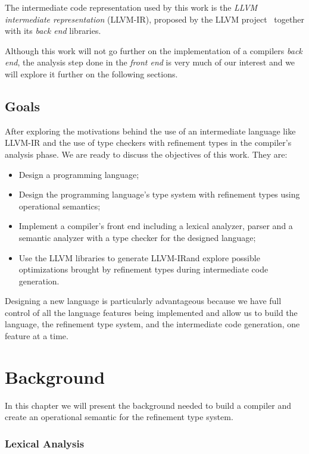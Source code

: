 \documentclass[english, lmodern, oneside, embeddedlogo]{ufsc-thesis-rn46-2019}
\begin{document}
The intermediate code representation used by this work is the \textit{LLVM intermediate representation} (LLVM-IR), proposed by the LLVM project~\cite{lattner2004llvm} together with its \textit{back end} libraries.

Although this work will not go further on the implementation of a compilers \textit{back end}, the analysis step done in the \textit{front end} is very much of our interest and we will explore it further on the following sections.

\section{Goals}\label{chapter:introduction:sec:goals}

After exploring the motivations behind the use of an intermediate language like LLVM-IR and the use of type checkers with refinement types in the compiler's analysis phase.
We are ready to discuss the objectives of this work.
They are:
\begin{itemize}
    \item Design a programming language;
    \item Design the programming language's type system with refinement types using operational semantics;
    \item Implement a compiler's front end including a lexical analyzer, parser and a semantic analyzer with a type checker for the designed language;
    \item Use the LLVM libraries to generate LLVM-IR\@ and explore possible optimizations brought by refinement types during intermediate code generation.
\end{itemize}

Designing a new language is particularly advantageous because we have full control of all the language features being implemented and allow us to build the language, the refinement type system, and the intermediate code generation, one feature at a time.

\chapter{Background}\label{chapter:background}

In this chapter we will present the background needed to build a compiler and create an operational semantic for the refinement type system.

\subsection{Lexical Analysis}
\end{document}
